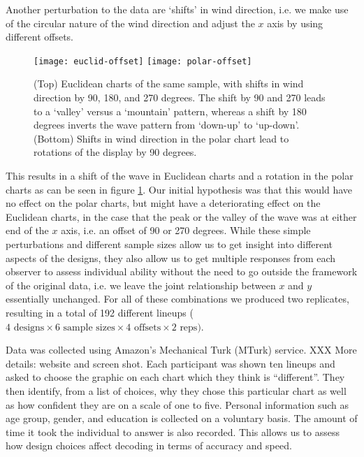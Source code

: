 Another perturbation to the data are `shifts' in wind direction, i.e. we make use of the circular nature of the wind direction and adjust the $x$ axis by using different offsets.

\begin{figure}[htbp] %
   \centering
   \texttt{[image: euclid-offset]} 
   \texttt{[image: polar-offset]} 
   \caption{ \label{fig:offset} (Top) Euclidean charts of the same sample, with shifts in wind direction by 90, 180, and 270 degrees. The shift by 90 and 270 leads to a `valley' versus a `mountain' pattern, whereas a shift by 180 degrees inverts the wave pattern from `down-up' to `up-down'.\hfill\newline
      (Bottom) Shifts in wind direction in the polar chart lead to rotations of the display by 90 degrees.}
\end{figure}

 This results in a shift of the wave in Euclidean charts and a rotation in the polar charts as can be seen in figure \ref{fig:offset}. Our initial hypothesis was that this would have no effect on the polar charts, but might have a deteriorating effect on the Euclidean charts, in the case that the peak or the valley of the wave was at either end of the $x$ axis, i.e. an offset of 90 or 270 degrees. 
While these simple perturbations and different sample sizes allow us to get insight into different aspects of the designs, they also allow us to get multiple responses from each observer to assess individual ability without the need to go outside the framework of the original data, i.e. we leave the joint relationship between $x$ and $y$ essentially unchanged. For all of these combinations we produced two replicates, resulting in a total of 192 different lineups ($ 4 \text{ designs} \times 6 \text{ sample sizes} \times 4 \text{ offsets} \times 2 \text{ reps})$.

Data was collected using Amazon's Mechanical Turk (MTurk) service. XXX More details: website and screen shot.
 Each participant was shown ten lineups and asked to choose the graphic on each chart which they think is ``different''. They then identify, from a list of choices, why they chose this particular chart as well as how confident they are on a scale of one to five. Personal information such as age group, gender, and education is collected on a voluntary basis. 
The amount of time it took the individual to answer is also recorded. This  allows us to assess how design choices affect decoding \citet{cleveland:1994} in terms of accuracy and speed.
 
